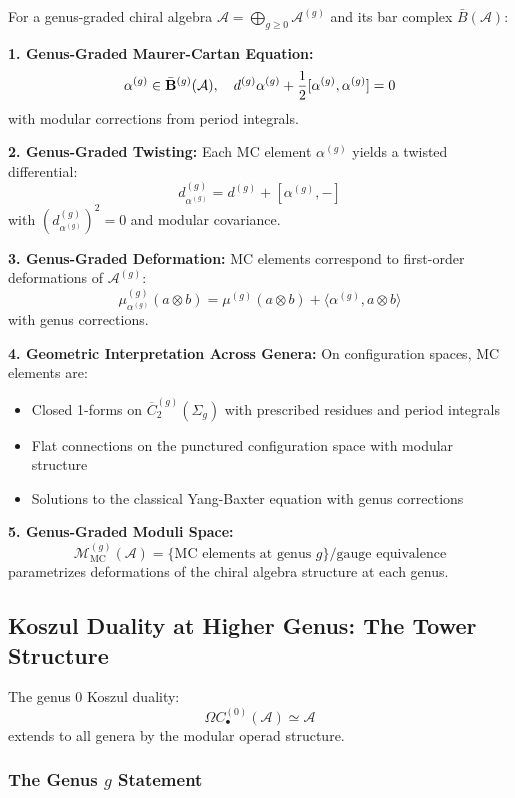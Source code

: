 \begin{theorem}
For a genus-graded chiral algebra $\mathcal{A} = \bigoplus_{g \geq 0} \mathcal{A}^{(g)}$ and its bar complex $\bar{B}(\mathcal{A})$:

\textbf{1. Genus-Graded Maurer-Cartan Equation:}
$$\alpha^{(g)} \in \bar{\mathbf{B}}^{(g)}(\mathcal{A}), \quad d^{(g)}\alpha^{(g)} + \frac{1}{2}[\alpha^{(g)}, \alpha^{(g)}] = 0$$
with modular corrections from period integrals.

\textbf{2. Genus-Graded Twisting:}
Each MC element $\alpha^{(g)}$ yields a twisted differential:
$$d_{\alpha^{(g)}}^{(g)} = d^{(g)} + [\alpha^{(g)}, -]$$
with $(d_{\alpha^{(g)}}^{(g)})^2 = 0$ and modular covariance.

\textbf{3. Genus-Graded Deformation:}
MC elements correspond to first-order deformations of $\mathcal{A}^{(g)}$:
$$\mu_{\alpha^{(g)}}^{(g)}(a \otimes b) = \mu^{(g)}(a \otimes b) + \langle \alpha^{(g)}, a \otimes b \rangle$$
with genus corrections.

\textbf{4. Geometric Interpretation Across Genera:}
On configuration spaces, MC elements are:
\begin{itemize}
\item Closed 1-forms on $\overline{C}_2^{(g)}(\Sigma_g)$ with prescribed residues and period integrals
\item Flat connections on the punctured configuration space with modular structure
\item Solutions to the classical Yang-Baxter equation with genus corrections
\end{itemize}

\textbf{5. Genus-Graded Moduli Space:}
$$\mathcal{M}_{\text{MC}}^{(g)}(\mathcal{A}) = \{\text{MC elements at genus } g\}/\text{gauge equivalence}$$
parametrizes deformations of the chiral algebra structure at each genus.
\end{theorem}

\subsection{Koszul Duality at Higher Genus: The Tower Structure}
\label{app:koszul_higher_genus}

The genus 0 Koszul duality:
$$\Omega C_{\bullet}^{(0)}(\mathcal{A}) \simeq \mathcal{A}$$
extends to all genera by the modular operad structure.

\subsubsection{The Genus $g$ Statement}

